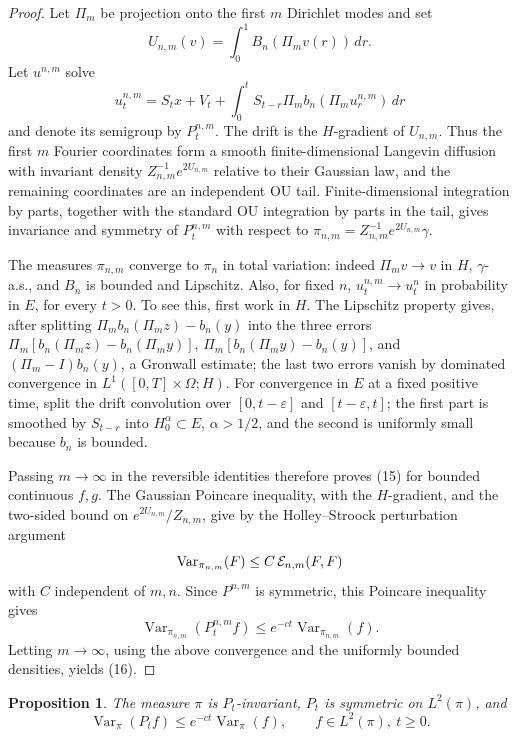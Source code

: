 \documentclass[12pt]{article}
\newtheorem{proposition}{Proposition}
\newcommand{\1}{\mathbf 1}
\newcommand{\Var}{\operatorname{Var}}
\begin{document}
\begin{proof}
Let \(\Pi_m\) be projection onto the first \(m\) Dirichlet modes and set
\[
        U_{n,m}(v)=\int_0^1 B_n(\Pi_m v(r))\,dr .
\]
Let \(u^{n,m}\) solve
\[
u_t^{n,m}=S_t x+V_t+\int_0^tS_{t-r}\Pi_m b_n(\Pi_m u_r^{n,m})\,dr
\]
and denote its semigroup by \(P_t^{n,m}\).  The drift is the \(H\)-gradient of
\(U_{n,m}\).  Thus the first \(m\) Fourier coordinates form a smooth
finite-dimensional Langevin diffusion with invariant density
\(Z_{n,m}^{-1}e^{2U_{n,m}}\) relative to their Gaussian law, and the remaining
coordinates are an independent OU tail.  Finite-dimensional integration by
parts, together with the standard OU integration by parts in the tail, gives
invariance and symmetry of \(P_t^{n,m}\) with respect to
\(\pi_{n,m}=Z_{n,m}^{-1}e^{2U_{n,m}}\gamma\).

The measures \(\pi_{n,m}\) converge to \(\pi_n\) in total variation: indeed
\(\Pi_m v\to v\) in \(H\), \(\gamma\)-a.s., and \(B_n\) is bounded and
Lipschitz.  Also, for fixed \(n\), \(u_t^{n,m}\to u_t^n\) in probability in
\(E\), for every \(t>0\).  To see this, first work in \(H\).  The Lipschitz
property gives, after splitting
\(\Pi_m b_n(\Pi_m z)-b_n(y)\) into the three errors
\(\Pi_m[b_n(\Pi_m z)-b_n(\Pi_m y)]\),
\(\Pi_m[b_n(\Pi_m y)-b_n(y)]\), and \((\Pi_m-I)b_n(y)\), a Gronwall estimate;
the last two errors vanish by dominated convergence in
\(L^1([0,T]\times\Omega;H)\).  For convergence in \(E\) at a fixed positive
time, split the drift convolution over \([0,t-\varepsilon]\) and
\([t-\varepsilon,t]\); the first part is smoothed by \(S_{t-r}\) into
\(H^\alpha_0\subset E\), \(\alpha>1/2\), and the second is uniformly small
because \(b_n\) is bounded.

Passing \(m\to\infty\) in the reversible identities therefore proves (15) for
bounded continuous \(f,g\).  The Gaussian Poincare inequality, with the
\(H\)-gradient, and the two-sided bound on \(e^{2U_{n,m}}/Z_{n,m}\), give by
the Holley--Stroock perturbation argument
\[
      \Var_{\pi_{n,m}}(F)\le C\,{\cal E}_{n,m}(F,F)
\]
with \(C\) independent of \(m,n\).  Since \(P^{n,m}\) is symmetric, this
Poincare inequality gives
\[
 \Var_{\pi_{n,m}}(P_t^{n,m}f)\le e^{-ct}\Var_{\pi_{n,m}}(f).
\]
Letting \(m\to\infty\), using the above convergence and the uniformly bounded
densities, yields (16).
\end{proof}

\begin{proposition}\label{prop:gap}
The measure \(\pi\) is \(P_t\)-invariant, \(P_t\) is symmetric on
\(L^2(\pi)\), and
\[
       \Var_\pi(P_t f)\le e^{-ct}\Var_\pi(f),
       \qquad f\in L^2(\pi),\ t\ge0 .                       \tag{17}
\]
\end{proposition}
\end{document}
